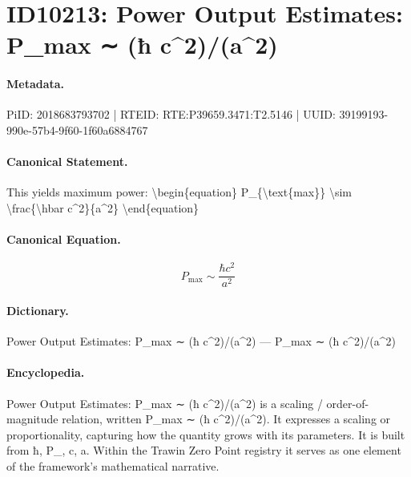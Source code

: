 \section*{ID10213: Power Output Estimates: P\_max ∼ (ħ c\textasciicircum{}2)/(a\textasciicircum{}2)}
\paragraph{Metadata.}
PiID: 2018683793702 | RTEID: RTE:P39659.3471:T2.5146 | UUID: 39199193-990e-57b4-9f60-1f60a6884767

\paragraph{Canonical Statement.}
This yields maximum power: \textbackslash{}begin\{equation\} P\_\{\textbackslash{}text\{max\}\} \textbackslash{}sim \textbackslash{}frac\{\textbackslash{}hbar c\textasciicircum{}2\}\{a\textasciicircum{}2\} \textbackslash{}end\{equation\}

\paragraph{Canonical Equation.}
\[
P_{\text{max}} \sim \frac{\hbar c^2}{a^2}
\]

\paragraph{Dictionary.}
Power Output Estimates: P\_max ∼ (ħ c\textasciicircum{}2)/(a\textasciicircum{}2) — P\_max ∼ (ħ c\textasciicircum{}2)/(a\textasciicircum{}2)

\paragraph{Encyclopedia.}
Power Output Estimates: P\_max ∼ (ħ c\textasciicircum{}2)/(a\textasciicircum{}2) is a scaling / order-of-magnitude relation, written P\_max ∼ (ħ c\textasciicircum{}2)/(a\textasciicircum{}2). It expresses a scaling or proportionality, capturing how the quantity grows with its parameters. It is built from ħ, P\_, c, a. Within the Trawin Zero Point registry it serves as one element of the framework's mathematical narrative.
